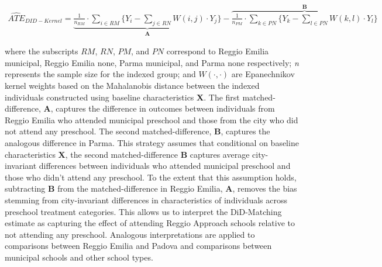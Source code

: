 \begin{tiny}
\begin{align} \label{eq:kernelDID}
\widehat{ATE}_{DID-Kernel} = \underbrace{\frac{1}{n_{RM}} \cdot \sum_{i \in RM} \bigg\{ Y_i - \sum_{j \in RN} W(i,j) \cdot Y_j \bigg\}}_{\bm{A}} - \overbrace{\frac{1}{n_{PM}} \cdot \sum_{k \in PN} \bigg\{ Y_k - \sum_{l \in PN} W(k,l) \cdot Y_l \bigg\}}^{\bm{B}}
\end{align}
\end{tiny}

where the subscripts $RM$, $RN$, $PM$, and $PN$ correspond to Reggio Emilia municipal, Reggio Emilia none, Parma municipal, and Parma none respectively; \textit{n} represents the sample size for the indexed group; and $W(\cdot,\cdot)$ are Epanechnikov kernel weights based on the Mahalanobis distance between the indexed individuals constructed using baseline characteristics $\bm{X}$. The first matched-difference, $\bm{A}$, captures the difference in outcomes between individuals from Reggio Emilia who attended municipal preschool and those from the city who did not attend any preschool. The second matched-difference, $\bm{B}$, captures the analogous difference in Parma. This strategy assumes that conditional on baseline characteristics $\bm{X}$, the second matched-difference $\bm{B}$ captures average city-invariant differences between individuals who attended municipal preschool and those who didn't attend any preschool. To the extent that this assumption holds, subtracting $\bm{B}$ from the matched-difference in Reggio Emilia, $\bm{A}$, removes the bias stemming from city-invariant differences in characteristics of individuals across preschool treatment categories. This allows us to interpret the DiD-Matching estimate as capturing the effect of attending Reggio Approach schools relative to not attending any preschool. Analogous interpretations are applied to comparisons between Reggio Emilia and Padova and comparisons between municipal schools and other school types.

